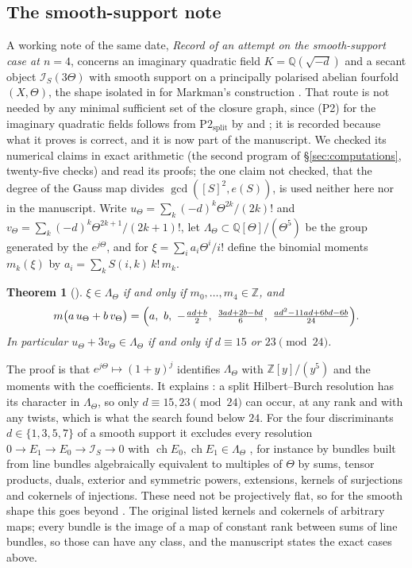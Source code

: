 \documentclass[11pt]{amsart}
\newtheorem{theorem}{Theorem}[section]
\theoremstyle{definition}
\theoremstyle{remark}
\newcommand{\QQ}{\mathbb{Q}}
\newcommand{\ZZ}{\mathbb{Z}}
\newcommand{\ch}{\operatorname{ch}}
\begin{document}
\subsection{The smooth-support note}\label{ssec:smooth}
A working note of the same date, \emph{Record of an attempt on the
smooth-support case at $n=4$}, concerns an imaginary quadratic field
$K=\QQ(\sqrt{-d})$ and a secant object $\mathcal{I}_{S}(3\Theta)$ with smooth
support on a principally polarised abelian fourfold $(X,\Theta)$, the shape
isolated in \cite[Corollary~18.68, Remark~18.69]{BMB} for Markman's
construction \cite{Mar25a,Mar25b}. That route is not needed by any minimal
sufficient set of the closure graph, since (P2) for the imaginary quadratic
fields follows from $\mathrm{P2}_{\mathrm{split}}$ by \cite[Proposition~20.13]{BMB}
and \cite[Theorem~20.58]{BMB}; it is recorded because what it proves is
correct, and it is now part of the manuscript. We checked its numerical
claims in exact arithmetic (the second program of \S\ref{sec:computations},
twenty-five checks) and read its proofs; the one claim not checked, that the
degree of the Gauss map divides $\gcd([S]^{2},e(S))$, is used neither here
nor in the manuscript. Write $u_{\Theta}=\sum_{k}(-d)^{k}\Theta^{2k}/(2k)!$ and
$v_{\Theta}=\sum_{k}(-d)^{k}\Theta^{2k+1}/(2k+1)!$, let
$\Lambda_{\Theta}\subset\QQ[\Theta]/(\Theta^{5})$ be the group generated by the
$e^{j\Theta}$, and for $\xi=\sum_{i}a_{i}\Theta^{i}/i!$ define the binomial
moments $m_{k}(\xi)$ by $a_{i}=\sum_{k}S(i,k)\,k!\,m_{k}$.

\begin{theorem}[{\cite[Lemma~18.56, Theorem~18.57]{BMB}}]\label{thm:lattice}
$\xi\in\Lambda_{\Theta}$ if and only if $m_{0},\dots,m_{4}\in\ZZ$, and
\[
  m\bigl(a\,u_{\Theta}+b\,v_{\Theta}\bigr)=\Bigl(a,\ b,\ -\tfrac{ad+b}{2},\
  \tfrac{3ad+2b-bd}{6},\ \tfrac{ad^{2}-11ad+6bd-6b}{24}\Bigr).
\]
In particular $u_{\Theta}+3v_{\Theta}\in\Lambda_{\Theta}$ if and only if
$d\equiv15$ or $23\pmod{24}$.
\end{theorem}

The proof is that $e^{j\Theta}\mapsto(1+y)^{j}$ identifies $\Lambda_{\Theta}$
with $\ZZ[y]/(y^{5})$ and the moments with the coefficients. It explains
\cite[Table~4]{BMB}: a split Hilbert--Burch resolution has its character in
$\Lambda_{\Theta}$, so only $d\equiv15,23\pmod{24}$ can occur, at any rank and
with any twists, which is what the search found below $24$. For the four
discriminants $d\in\{1,3,5,7\}$ of a smooth support
\cite[Corollary~18.41]{BMB} it excludes every resolution
$0\to E_{1}\to E_{0}\to\mathcal{I}_{S}\to0$ with $\ch E_{0},\ch E_{1}\in
\Lambda_{\Theta}$ \cite[Corollary~18.58]{BMB}, for instance by bundles built
from line bundles algebraically equivalent to multiples of $\Theta$ by sums,
tensor products, duals, exterior and symmetric powers, extensions, kernels of
surjections and cokernels of injections. These need not be projectively flat,
so for the smooth shape this goes beyond \cite[Theorems~18.63 and~18.66]{BMB}.
The original listed kernels and cokernels of arbitrary maps; every bundle is
the image of a map of constant rank between sums of line bundles, so those
can have any class, and the manuscript states the exact cases above.
\end{document}

